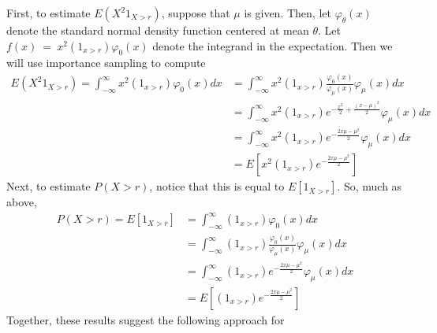 \documentclass[12pt]{article}
\theoremstyle{plain}
\theoremstyle{definition}
\theoremstyle{remark}
\begin{document}
\begin{enumerate}
\begin{enumerate}
        First, to estimate $E(X^2 1_{X>r})$, suppose that $\mu$ is
        given.  Then, let $\varphi_\theta(x)$ denote the standard normal
        density function centered at mean $\theta$. Let $f(x)~=~x^2
        (1_{x>r})\varphi_0(x)$ denote the integrand in the expectation.
        Then we will use importance sampling to compute
        \begin{align*}
          E(X^2 1_{X>r}) =
          \int^\infty_{-\infty} x^2 (1_{x>r})\varphi_0(x) dx
          &=
          \int^\infty_{-\infty} x^2
          (1_{x>r})\frac{\varphi_0(x)}{\varphi_\mu(x)} \varphi_\mu(x) dx\\
          &= \int^\infty_{-\infty} x^2(1_{x>r})
          e^{-\frac{x^2}{2} + \frac{(x-\mu)^2}{2}} \varphi_\mu(x) dx\\
          &= \int^\infty_{-\infty} x^2(1_{x>r})
          e^{-\frac{2x\mu -\mu^2}{2}} \varphi_\mu(x) dx\\
          &= E\left[x^2(1_{x>r}) e^{-\frac{2x\mu -\mu^2}{2}}\right]
        \end{align*}
        Next, to estimate $P(X>r)$, notice that this is equal to
        $E[1_{X>r}]$. So, much as above,
        \begin{align*}
          P(X>r) = E[1_{X>r}] &=
          \int^\infty_{-\infty} (1_{x>r})\varphi_0(x) dx \\
          &=
          \int^\infty_{-\infty}
          (1_{x>r})\frac{\varphi_0(x)}{\varphi_\mu(x)} \varphi_\mu(x) dx\\
          &= \int^\infty_{-\infty} (1_{x>r})
          e^{-\frac{2x\mu -\mu^2}{2}} \varphi_\mu(x) dx\\
          &= E\left[(1_{x>r}) e^{-\frac{2x\mu -\mu^2}{2}}\right]
        \end{align*}
        Together, these results suggest the following approach for

\end{enumerate}
\end{enumerate}
\end{document}
